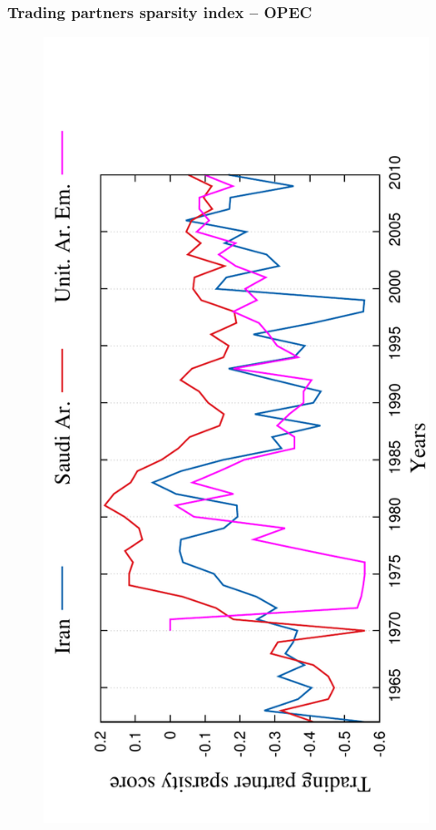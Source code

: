 \documentclass[11pt,xcolor=table]{beamer}
\begin{document}
\begin{frame}
  \frametitle{Trading partners sparsity index -- OPEC}
    \begin{figure}
    \centering
    \includegraphics[angle=-90,scale=0.5]{../code/extra_results/trading_partner_density/scores/opec22.pdf}
  \end{figure}
\end{frame}
\end{document}
